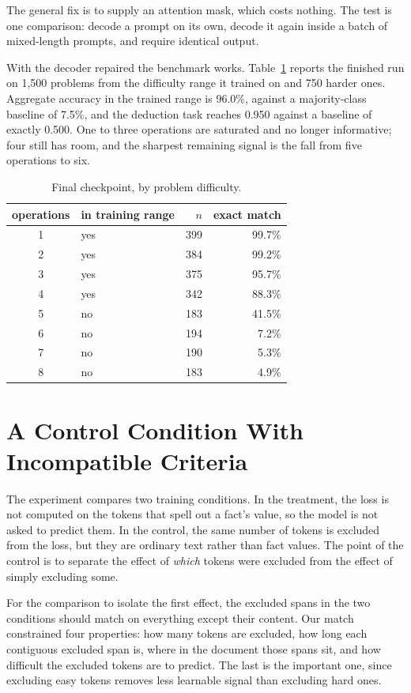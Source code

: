 \documentclass[10pt,twocolumn]{article}
\begin{document}
The general fix is to supply an attention mask, which costs nothing. The test
is one comparison: decode a prompt on its own, decode it again inside a batch
of mixed-length prompts, and require identical output.

With the decoder repaired the benchmark works. Table~\ref{tab:ops} reports the
finished run on 1{,}500 problems from the difficulty range it trained on and 750
harder ones. Aggregate accuracy in the trained range is 96.0\%, against a
majority-class baseline of 7.5\%, and the deduction task reaches 0.950 against a
baseline of exactly 0.500. One to three operations are saturated and no longer
informative; four still has room, and the sharpest remaining signal is the fall
from five operations to six.

\begin{table}[h]
\centering\small
\begin{tabular}{clrr}
\toprule
operations & in training range & $n$ & exact match \\
\midrule
1 & yes & 399 & 99.7\% \\
2 & yes & 384 & 99.2\% \\
3 & yes & 375 & 95.7\% \\
4 & yes & 342 & 88.3\% \\
5 & no  & 183 & 41.5\% \\
6 & no  & 194 & 7.2\% \\
7 & no  & 190 & 5.3\% \\
8 & no  & 183 & 4.9\% \\
\bottomrule
\end{tabular}
\caption{Final checkpoint, by problem difficulty.}
\label{tab:ops}
\end{table}

\section{A Control Condition With Incompatible Criteria}
\label{sec:ctrl}

The experiment compares two training conditions. In the treatment, the loss is
not computed on the tokens that spell out a fact's value, so the model is not
asked to predict them. In the control, the same number of tokens is excluded
from the loss, but they are ordinary text rather than fact values. The point of
the control is to separate the effect of \emph{which} tokens were excluded from
the effect of simply excluding some.

For the comparison to isolate the first effect, the excluded spans in the two
conditions should match on everything except their content. Our match
constrained four properties: how many tokens are excluded, how long each
contiguous excluded span is, where in the document those spans sit, and how
difficult the excluded tokens are to predict. The last is the important one,
since excluding easy tokens removes less learnable signal than excluding hard
ones.
\end{document}
